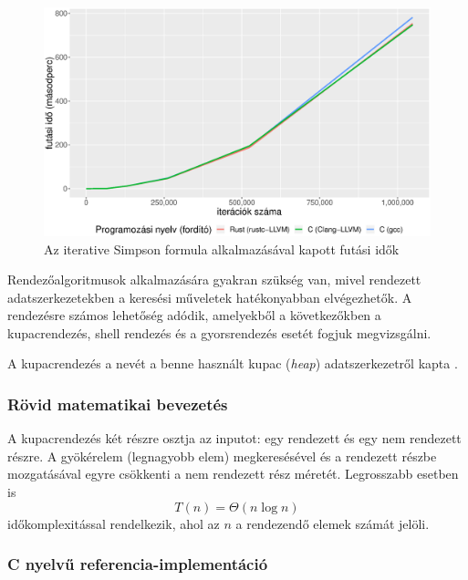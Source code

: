 \begin{figure}[h!]
\centering
\includegraphics[width=15.5cm]{kepek/simpsons_rule_run.eps}
\caption{Az iterative Simpson formula alkalmazásával kapott futási idők}
\label{fig:iterative_simpson}
\end{figure}


Rendezőalgoritmusok alkalmazására gyakran szükség van, mivel rendezett adatszerkezetekben a keresési műveletek hatékonyabban elvégezhetők. A rendezésre számos lehetőség adódik, amelyekből a következőkben a kupacrendezés, shell rendezés és a gyorsrendezés esetét fogjuk megvizsgálni.


A kupacrendezés a nevét a benne használt kupac (\textit{heap}) adatszerkezetről kapta \cite{heapsort}.

\subsubsection{Rövid matematikai bevezetés}

A kupacrendezés két részre osztja az inputot: egy rendezett és egy nem rendezett részre. A gyökérelem (legnagyobb elem) megkeresésével és a rendezett részbe mozgatásával egyre csökkenti a nem rendezett rész méretét. Legrosszabb esetben is \[ T(n) = \Theta(n \log n)\] időkomplexitással rendelkezik, ahol az $n$ a rendezendő elemek számát jelöli.

\subsubsection{C nyelvű referencia-implementáció}

